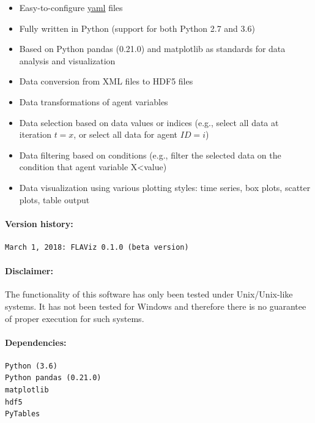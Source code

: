 \documentclass[10pt,a4paper]{article}
\begin{document}
\begin{itemize}
\item Easy-to-configure \url{yaml} files

\item Fully written in Python (support for both Python 2.7 and 3.6)

\item Based on Python pandas (0.21.0) and matplotlib as standards for data analysis and visualization

\item Data conversion from XML files to HDF5 files

\item Data transformations of agent variables

\item Data selection based on data values or indices (e.g., select all data at iteration $t=x$, or select all data for agent $ID=i$)

\item Data filtering based on conditions (e.g., filter the selected data on the condition that agent variable X<value)

\item Data visualization using various plotting styles: time series, box plots, scatter plots, table output
\end{itemize}


\paragraph{Version history:}
\begin{verbatim}
March 1, 2018: FLAViz 0.1.0 (beta version)
\end{verbatim}


\paragraph{Disclaimer:} The functionality of this software has only been tested under Unix/Unix-like systems. It has not been tested for Windows and therefore there is no guarantee of proper execution for such systems.

\paragraph{Dependencies:}

\begin{verbatim}
Python (3.6)
Python pandas (0.21.0)
matplotlib
hdf5
PyTables
\end{verbatim}
\end{document}
